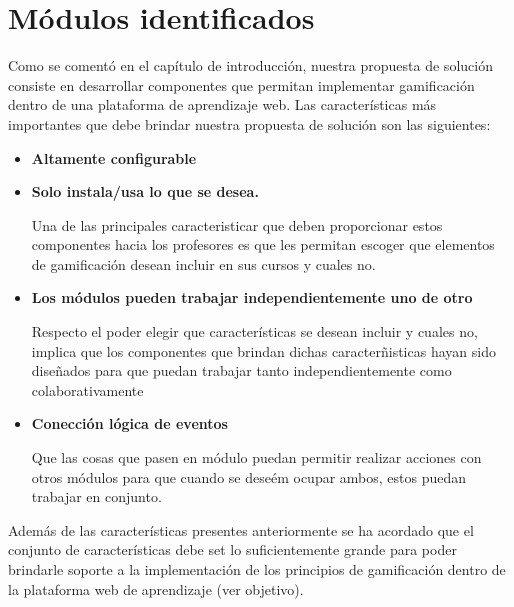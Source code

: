 
\section{Módulos identificados}
\label{analisis:modulos}

 Como se comentó en el capítulo de introducción, nuestra propuesta de solución consiste en
 desarrollar componentes que permitan implementar gamificación dentro de una plataforma de
 aprendizaje web. Las características más importantes que debe brindar nuestra propuesta
 de solución son las siguientes:

    \begin{itemize}
    \item {\bf\color{primary} Altamente configurable}

    \item {\bf\color{primary} Solo instala/usa lo que se desea.}

        Una de las principales caracteristicar que deben proporcionar estos
        componentes hacia los profesores es que les permitan escoger que elementos
        de gamificación desean incluir en sus cursos y cuales no.\\

    \item {\bf\color{primary} Los módulos pueden trabajar independientemente uno de otro}

        Respecto el poder elegir que características se desean incluir y cuales no,
        implica que los componentes que brindan dichas caracterñisticas hayan sido
        diseñados para que puedan trabajar tanto independientemente como
        colaborativamente

    \item {\bf\color{primary} Conección lógica de eventos}

        Que las cosas que pasen en módulo puedan permitir realizar acciones con
        otros módulos para que cuando se deseém ocupar ambos, estos puedan trabajar
        en conjunto.

    \end{itemize}
 
 \noindent 
 Además de las características presentes anteriormente se ha acordado que el conjunto
 de características debe set lo suficientemente grande para poder brindarle soporte a
 la implementación de los principios de gamificación dentro de la plataforma web de
 aprendizaje (ver objetivo).



